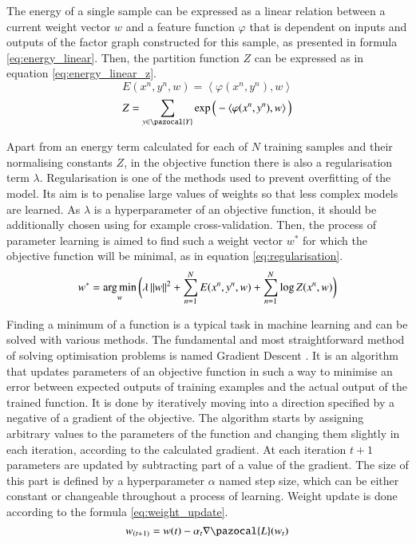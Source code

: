 The energy of a single sample can be expressed as a linear relation between a current weight vector $w$ and a feature function $\varphi$ that is dependent on inputs and outputs of the factor graph constructed for this sample, as presented in formula \ref{eq:energy_linear}. Then, the partition function $Z$ can be expressed as in equation \ref{eq:energy_linear_z}.
\begin{equation}
    \label{eq:energy_linear}
    E(x^n,y^n,w) = \left \langle \varphi(x^n,y^n),w \right \rangle 
\end{equation}
\begin{equation}
    \label{eq:energy_linear_z}
    Z = \sum_{y \in \pazocal{Y}}{\exp \Big(-\left \langle \varphi(x^n,y^n),w \right \rangle \Big)}
\end{equation}

Apart from an energy term calculated for each of $N$ training samples and their normalising constants $Z$, in the objective function there is also a regularisation term $\lambda$. Regularisation is one of the methods used to prevent overfitting of the model. Its aim is to penalise large values of weights so that less complex models are learned. As $\lambda$ is a hyperparameter of an objective function, it should be additionally chosen using for example cross-validation. Then, the process of parameter learning is aimed to find such a weight vector $w^*$ for which the objective function will be minimal, as in equation \ref{eq:regularisation}.
\begin{equation}
    \label{eq:regularisation}
    w^* = \operatorname*{arg\,min}_{w}{\bigg(\lambda \left \| w \right \|^2 + \sum_{n=1}^{N}{E(x^n,y^n,w)} + \sum_{n=1}^{N}{\log{Z}(x^n,w)}\bigg)}
\end{equation}

Finding a minimum of a function is a typical task in machine learning and can be solved with various methods. The fundamental and most straightforward method of solving optimisation problems is named Gradient Descent \cite{optimisation_deep_learning}. It is an algorithm that updates parameters of an objective function in such a way to minimise an error between expected outputs of training examples and the actual output of the trained function. It is done by iteratively moving into a direction specified by a negative of a gradient of the objective. The algorithm starts by assigning arbitrary values to the parameters of the function and changing them slightly in each iteration, according to the calculated gradient. At each iteration $t+1$ parameters are updated by subtracting part of a value of the gradient. The size of this part is defined by a hyperparameter $\alpha$ named step size, which can be either constant or changeable throughout a process of learning. Weight update is done according to the formula \ref{eq:weight_update}.
\begin{equation}
    \label{eq:weight_update}
    w_{(t+1)} = w(t) - \alpha_t \nabla \pazocal{L}(w_t)
\end{equation}

